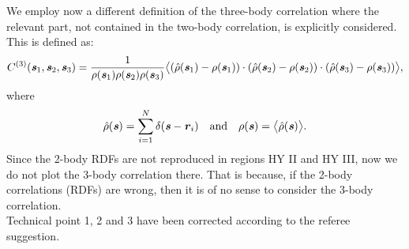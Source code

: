 \documentclass[12pt,a4paper]{article}
\newcommand{\corr}{C^{(3)}}
\newcommand{\vect}[1]{\textbf{\textit{#1}}}
\begin{document}
We employ now a different definition of the three-body correlation where the relevant part, not contained in the two-body correlation, is explicitly considered. This is defined as:
\begin{equation}
  \corr (\vect s_1, \vect s_2, \vect s_3)
  =
  \frac1{\rho(\vect s_1)\rho(\vect s_2)\rho(\vect s_3)}
  \big\langle
  (\hat\rho(\vect s_1) - \rho(\vect s_1))\cdot
  (\hat\rho(\vect s_2) - \rho(\vect s_2))\cdot
  (\hat\rho(\vect s_3) - \rho(\vect s_3))
  \big\rangle,
\end{equation}
where
\begin{equation}
  \hat\rho(\vect s) = \sum_{i=1}^N\delta(\vect s - \vect r_i)
  \quad\textrm{and}\quad
  \rho(\vect s) = \big\langle \hat\rho(\vect s)\big\rangle.
\end{equation}
Since the 2-body RDFs are not reproduced in regions HY II and HY III,
now we do not plot the 3-body correlation there.
That is because, if the 2-body correlations (RDFs) are wrong, then it is of no sense to
consider the 3-body correlation.\\

Technical point 1, 2 and 3 have been corrected according to the referee suggestion.\\
\end{document}
